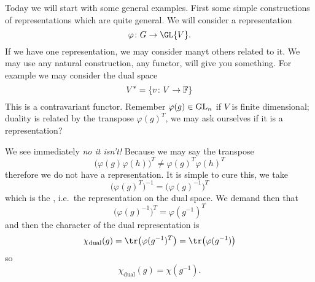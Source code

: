 
Today we will start with some general examples. First some simple
constructions of representations which are quite general. We will
consider a representation
\begin{equation}
\varphi\colon G\to\GL{V}.
\end{equation}
If we have one representation, we may consider manyt others
related to it. We may use any natural construction, any functor,
will give you something. For example we may consider the dual
space 
\begin{equation}
V^{*}=\left\{ v\colon V\to\Bbb{F}\right\}
\end{equation}
This is a contravariant functor. Remember $\varphi(g)\in{\rm
  GL}_{n}$ if $V$ is finite dimensional; duality is related by
the transpose $\varphi(g)^{T}$, we may ask ourselves if it is a
representation?

We see immediately \emph{no it isn't!} Because we may say the
transpose
\begin{equation}
\big(\varphi(g)\varphi(h)\big)^{T}\not=\varphi(g)^{T}\varphi(h)^{T}
\end{equation}
therefore we do not have a representation. It is simple to cure
this, we take
\begin{equation}
\big(\varphi(g)^{T}\big)^{-1}=\big(\varphi(g)^{-1}\big)^{T}
\end{equation}
which is the , i.e.\ the
representation on the dual space. We demand then that
\begin{equation}
\big(\varphi(g)^{-1}\big)^{T}=\varphi(g^{-1})^{T}
\end{equation}
and then the character of the dual representation is
\begin{equation}
\chi_{\text{dual}}(g)=\tr\big(\varphi(g^{-1})^{T}\big)=\tr\big(\varphi(g^{-1})\big)
\end{equation}
so
\begin{equation}
\chi_{\text{dual}}(g)=\chi(g^{-1}).
\end{equation}

